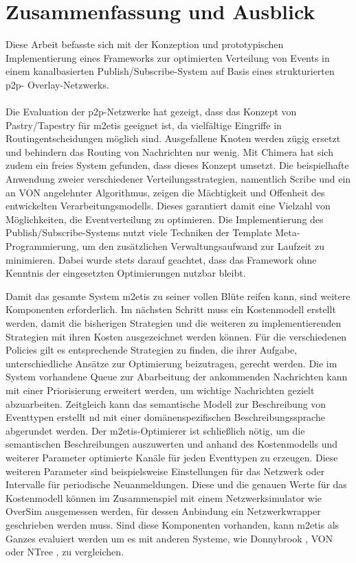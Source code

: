 \chapter{Zusammenfassung und Ausblick} 
\label{chap:zus}
Diese Arbeit befasste sich mit der Konzeption und prototypischen Implementierung eines Frameworks zur optimierten Verteilung von Events in einem kanalbasierten Publish/Subscribe-System auf Basis eines strukturierten p2p- Overlay-Netzwerks.\\
\\
Die Evaluation der p2p-Netzwerke hat gezeigt, dass das Konzept von Pastry/Tapestry für \ac{m2etis} geeignet ist, da vielfältige Eingriffe in Routingentscheidungen möglich sind. Ausgefallene Knoten werden zügig ersetzt und behindern das Routing von Nachrichten nur wenig. Mit Chimera hat sich zudem ein freies System gefunden, dass dieses Konzept umsetzt. Die beispielhafte Anwendung zweier verschiedener Verteilungsstrategien, namentlich Scribe und ein an VON angelehnter Algorithmus, zeigen die Mächtigkeit und Offenheit des entwickelten Verarbeitungsmodells. Dieses garantiert damit eine Vielzahl von Möglichkeiten, die Eventverteilung zu optimieren. Die Implementierung des Publish/Subscribe-Systems nutzt viele Techniken der Template Meta-Programmierung, um den zusätzlichen Verwaltungsaufwand zur Laufzeit zu minimieren. Dabei wurde stets darauf geachtet, dass das Framework ohne Kenntnis der eingesetzten Optimierungen nutzbar bleibt.

Damit das gesamte System \ac{m2etis} zu seiner vollen Blüte reifen kann, sind weitere Komponenten erforderlich. Im nächsten Schritt muss ein Kostenmodell erstellt werden, damit die bisherigen Strategien und die weiteren zu implementierenden Strategien mit ihren Kosten ausgezeichnet werden können. Für die verschiedenen Policies gilt es entsprechende Strategien zu finden, die ihrer Aufgabe, unterschiedliche Ansätze zur Optimierung beizutragen, gerecht werden. Die im System vorhandene Queue zur Abarbeitung der ankommenden Nachrichten kann mit einer Priorisierung erweitert werden, um wichtige Nachrichten gezielt abzuarbeiten. Zeitgleich kann das semantische Modell zur Beschreibung von Eventtypen erstellt nd mit einer domänenspezifischen Beschreibungssprache abgerundet werden. Der \ac{m2etis}-Optimierer ist schließlich nötig, um die semantischen Beschreibungen auszuwerten und anhand des Kostenmodells und weiterer Parameter optimierte Kanäle für jeden Eventtypen zu erzeugen. Diese weiteren Parameter sind beispielsweise Einstellungen für das Netzwerk oder Intervalle für periodische Neuanmeldungen. Diese und die genauen Werte für das Kostenmodell können im Zusammenspiel mit einem Netzwerksimulator wie OverSim \cite{Baumgart2007OverSim} ausgemessen werden, für dessen Anbindung ein Netzwerkwrapper geschrieben werden muss. Sind diese Komponenten vorhanden, kann \ac{m2etis} als Ganzes evaluiert werden um es mit anderen Systeme, wie Donnybrook \cite{Bharambe2008Donnybrook}, VON \cite{Hu2006VON} oder NTree \cite{GauthierDickey2005Using}, zu vergleichen.
